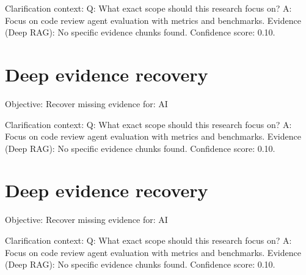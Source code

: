 \documentclass[conference]{IEEEtran}
\begin{document}
Clarification context:
Q: What exact scope should this research focus on?
A: Focus on code review agent evaluation with metrics and benchmarks.
Evidence (Deep RAG):
No specific evidence chunks found.
Confidence score: 0.10.

\section{Deep evidence recovery}
Objective: Recover missing evidence for: AI

Clarification context:
Q: What exact scope should this research focus on?
A: Focus on code review agent evaluation with metrics and benchmarks.
Evidence (Deep RAG):
No specific evidence chunks found.
Confidence score: 0.10.

\section{Deep evidence recovery}
Objective: Recover missing evidence for: AI

Clarification context:
Q: What exact scope should this research focus on?
A: Focus on code review agent evaluation with metrics and benchmarks.
Evidence (Deep RAG):
No specific evidence chunks found.
Confidence score: 0.10.

\
\

\
\end{document}
